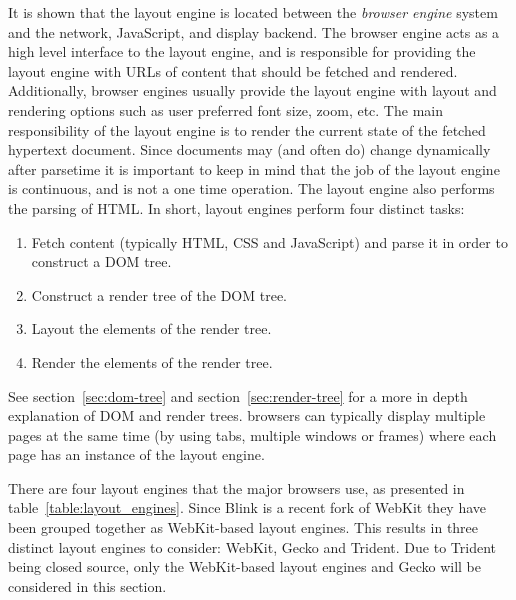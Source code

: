 \documentclass[a4paper,11pt]{kth-mag}
\begin{document}
        It is shown that the \gls{layout engine} is located between the \emph{\gls{browser} engine} system and the network, \gls{JavaScript}, and display backend.
        The \gls{browser} engine acts as a high level interface to the \gls{layout engine}, and is responsible for providing the \gls{layout engine} with \glspl{URL} of content that should be fetched and rendered.
        Additionally, browser engines usually provide the layout engine with layout and rendering options such as user preferred font size, zoom, etc.
        The main responsibility of the \gls{layout engine} is to render the current state of the fetched \gls{hypertext} \gls{document}.
        Since \glspl{document} may (and often do) change dynamically after parsetime it is important to keep in mind that the job of the \gls{layout engine} is continuous, and is not a one time operation.
        The \gls{layout engine} also performs the parsing of \gls{HTML}.
        In short, \glspl{layout engine} perform four distinct tasks:
        \begin{enumerate}
          \item Fetch content (typically \gls{HTML}, \gls{CSS} and \gls{JavaScript}) and parse it in order to construct a \gls{DOM} tree. 
          \item Construct a \gls{render tree} of the \gls{DOM} tree.
          \item Layout the \glspl{element} of the \gls{render tree}.
          \item Render the \glspl{element} of the \gls{render tree}.
        \end{enumerate}
        See section~\ref{sec:dom-tree} and section~\ref{sec:render-tree} for a more in depth explanation of \gls{DOM} and \glspl{render tree}.
        \Glspl{browser} can typically display multiple pages at the same time (by using tabs, multiple windows or frames) where each page has an instance of the \gls{layout engine}.

        There are four \glspl{layout engine} that the major \glspl{browser} use, as presented in table~\ref{table:layout_engines}.
        Since Blink is a recent \gls{fork} of \gls{WebKit} they have been grouped together as \gls{WebKit}-based \glspl{layout engine}.
        This results in three distinct \glspl{layout engine} to consider: \gls{WebKit}, Gecko and Trident.
        Due to Trident being closed source, only the \gls{WebKit}-based \glspl{layout engine} and Gecko will be considered in this section.
\end{document}
